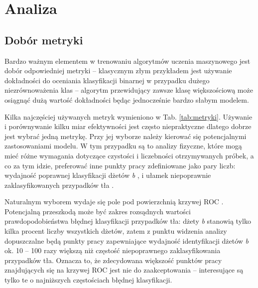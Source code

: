 \section{Analiza}
\label{sec:analiza}


\subsection{Dobór metryki}

Bardzo ważnym elementem w trenowaniu algorytmów uczenia maszynowego jest dobór odpowiedniej metryki -- klasycznym złym przykładem jest używanie dokładności  do oceniania klasyfikacji binarnej w przypadku dużego niezrównoważenia klas -- algorytm przewidujący zawsze klasę większościową może osiągnąć dużą wartość dokładności będąc jednocześnie bardzo słabym modelem.

Kilka najczęściej używanych metryk wymieniono w Tab. \ref{tab:metryki}. Używanie i porównywanie kilku miar efektywności jest często niepraktyczne dlatego dobrze jest wybrać jedną metrykę. Przy jej wyborze należy kierować się potencjalnymi zastosowaniami modelu. W tym przypadku są to analizy fizyczne, które mogą mieć różne wymagania dotyczące czystości i liczebności otrzymywanych próbek, a co za tym idzie, preferować inne punkty pracy zdefiniowane jako pary liczb: wydajność poprawnej klasyfikacji dżetów \textit{b} , i ułamek niepoprawnie zaklasyfikowanych przypadków tła . 

Naturalnym wyborem wydaje się pole pod powierzchnią krzywej ROC  \cite{bradley1997use}. Potencjalną przeszkodą może być zakres rozsądnych wartości prawdopodobieństwa błędnej klasyfikacji przypadków tła: dżety \textit{b} stanowią tylko kilka procent liczby wszystkich dżetów, zatem z punktu widzenia analizy dopuszczalne będą punkty pracy zapewniające wydajność identyfikacji dżetów \textit{b} ok. 10 -- 100 razy większą niż częstość niepoprawnego zaklasyfikowania przypadków tła. Oznacza to, że zdecydowana większość punktów pracy znajdujących się na krzywej ROC jest nie do zaakceptowania -- interesujące są tylko te o najniższych częstościach błędnej klasyfikacji.

